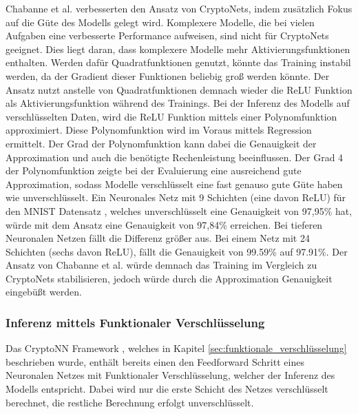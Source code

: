 Chabanne et al. \cite{P-55} verbesserten den Ansatz von CryptoNets, indem zusätzlich Fokus auf die Güte des Modells gelegt wird. 
Komplexere Modelle, die bei vielen Aufgaben eine verbesserte Performance aufweisen, sind nicht für CryptoNets geeignet.
Dies liegt daran, dass komplexere Modelle mehr Aktivierungsfunktionen enthalten. 
Werden dafür Quadratfunktionen genutzt, könnte das Training instabil werden, da der Gradient dieser Funktionen beliebig groß werden könnte.
Der Ansatz nutzt anstelle von Quadratfunktionen demnach wieder die ReLU Funktion als Aktivierungsfunktion während des Trainings.
Bei der Inferenz des Modells auf verschlüsselten Daten, wird die ReLU Funktion mittels einer Polynomfunktion approximiert.
Diese Polynomfunktion wird im Voraus mittels Regression ermittelt. 
Der Grad der Polynomfunktion kann dabei die Genauigkeit der Approximation und auch die benötigte Rechenleistung beeinflussen.
Der Grad 4 der Polynomfunktion zeigte bei der Evaluierung eine ausreichend gute Approximation, sodass Modelle verschlüsselt eine fast genauso gute Güte haben wie unverschlüsselt.
Ein Neuronales Netz mit 9 Schichten (eine davon ReLU) für den MNIST Datensatz \cite{D-MNIST}, welches unverschlüsselt eine Genauigkeit von 97,95\% hat, würde mit dem Ansatz eine Genauigkeit von 97,84\% erreichen.
Bei tieferen Neuronalen Netzen fällt die Differenz größer aus. 
Bei einem Netz mit 24 Schichten (sechs davon ReLU), fällt die Genauigkeit von 99.59\% auf 97.91\%.
Der Ansatz von Chabanne et al. \cite{P-55} würde demnach das Training im Vergleich zu CryptoNets \cite{P-54} stabilisieren, jedoch würde durch die Approximation Genauigkeit eingebüßt werden.


\subsubsection*{Inferenz mittels Funktionaler Verschlüsselung}
Das CryptoNN Framework \cite{P-53}, welches in Kapitel \ref{sec:funktionale_verschlüsselung} beschrieben wurde, enthält bereits einen den Feedforward Schritt eines Neuronalen Netzes mit Funktionaler Verschlüsselung, welcher der Inferenz des Modells entspricht.
Dabei wird nur die erste Schicht des Netzes verschlüsselt berechnet, die restliche Berechnung erfolgt unverschlüsselt.

